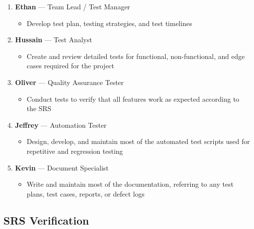 \documentclass[12pt, titlepage]{article}
\begin{document}
\begin{enumerate}
    \item \textbf{Ethan} --- Team Lead / Test Manager
    \begin{itemize}
        \item Develop test plan, testing strategies, and test timelines
    \end{itemize}

    \item \textbf{Hussain} --- Test Analyst
    \begin{itemize}
        \item Create and review detailed tests for functional, non-functional,
         and edge cases required for the project
    \end{itemize}

    \item \textbf{Oliver} --- Quality Assurance Tester
    \begin{itemize}
        \item Conduct tests to verify that all features work as
        expected according to the SRS
    \end{itemize}

    \item \textbf{Jeffrey} --- Automation Tester
    \begin{itemize}
        \item Design, develop, and maintain most of the automated
        test scripts used for repetitive and regression testing
    \end{itemize}

    \item \textbf{Kevin} --- Document Specialist
    \begin{itemize}
        \item Write and maintain most of the documentation,
        referring to any test plans, test cases, reports, or defect logs
    \end{itemize}
\end{enumerate}


\subsection{SRS Verification}
\end{document}
